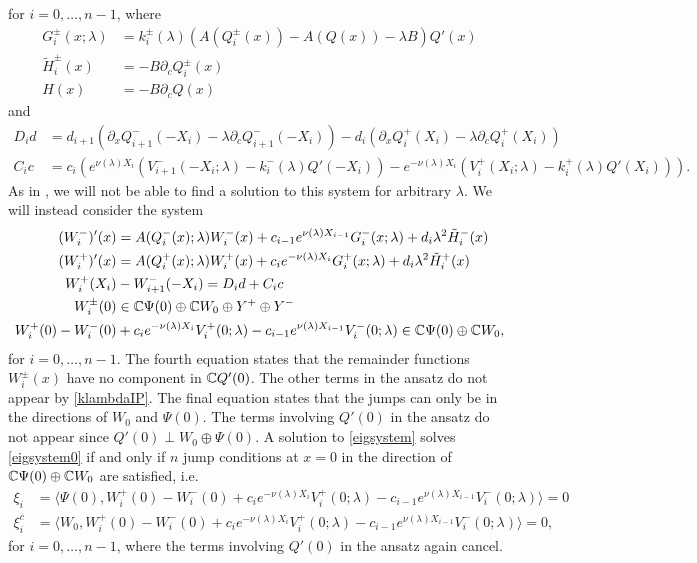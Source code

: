 \documentclass[12pt]{elsarticle}
\theoremstyle{plain}
\theoremstyle{definition}
\theoremstyle{remark}
\numberwithin{theorem}{section}
\numberwithin{equation}{section}
\begin{document}
for $i = 0, \dots, n-1$, where
\begin{equation}\label{defGH}
\begin{aligned}
G_i^\pm(x; \lambda) &= k_i^\pm(\lambda)\left( A(Q_i^\pm(x)) - A(Q(x)) - \lambda B \right) Q'(x) \\
\tilde{H}_i^\pm(x) &= -B \partial_c Q_i^\pm(x)\\
H(x) &= -B \partial_c Q(x)
\end{aligned}
\end{equation}
and
\begin{align}
D_i d &= d_{i+1}\left(\partial_x Q_{i+1}^-(-X_i) - \lambda \partial_c Q_{i+1}^-(-X_i)\right) - d_i \left( \partial_x Q_i^+(X_i) - \lambda \partial_c Q_i^+(X_i) \right) \label{defDid} \\
C_i c &= c_i \left( e^{\nu(\lambda) X_i} (V_{i+1}^-(-X_i; \lambda) - k_i^-(\lambda)Q'(-X_i)) - e^{-\nu(\lambda) X_i} (V_i^+(X_i; \lambda) - k_i^+(\lambda) Q'(X_i)) \right). \label{defCic}
\end{align}
As in \cite{Sandstede1998}, we will not be able to find a solution to this system for arbitrary $\lambda$. We will instead consider the system
\begin{equation}\label{eigsystem}
\begin{aligned}
(W_i^-)'(x) &= A(Q_i^-(x); \lambda) W_i^-(x) + c_{i-1} e^{\nu(\lambda)X_{i-1}}  G_i^-(x; \lambda) + d_i \lambda^2 \tilde{H}_i^-(x) \\
(W_i^+)'(x) &= A(Q_i^+(x); \lambda) W_i^+(x) + c_i e^{-\nu(\lambda)X_i}  G_i^+(x; \lambda) + d_i \lambda^2 \tilde{H}_i^+(x) \\
W_i^+(X_i) &- W_{i+1}^-(-X_i) = D_i d + C_i c \\
W_i^\pm(0) &\in \mathbb{C} \Psi(0) \oplus \mathbb{C} W_0 \oplus Y^+ \oplus Y^- \\
W_i^+(0) - W_i^-(0) &+ c_i e^{-\nu(\lambda)X_i}V_i^+(0; \lambda) - c_{i-1} e^{\nu(\lambda)X_{i-1}} V_i^-(0; \lambda) \in \mathbb{C} \Psi(0) \oplus \mathbb{C} W_0,
\end{aligned}
\end{equation}
for $i = 0, \dots, n-1$. The fourth equation states that the remainder functions $W_i^\pm(x)$ have no component in $\mathbb{C} Q'(0)$. The other terms in the ansatz do not appear by \cref{klambdaIP}. The final equation states that the jumps can only be in the directions of $W_0$ and $\Psi(0)$. The terms involving $Q'(0)$ in the ansatz do not appear since $Q'(0) \perp W_0\oplus\Psi(0)$. A solution to \cref{eigsystem} solves \cref{eigsystem0} if and only if $n$ jump conditions at $x = 0$ in the direction of $\mathbb{C} \Psi(0) \oplus \mathbb{C} W_0$ are satisfied, i.e.  
\begin{equation}\label{jumpxi1}
\begin{aligned}
\xi_i &= \langle \Psi(0), W_i^+(0) - W_i^-(0) + c_i e^{-\nu(\lambda)X_i}V_i^+(0; \lambda) - c_{i-1} e^{\nu(\lambda)X_{i-1}} V_i^-(0; \lambda) \rangle = 0  \\
\xi_i^c &= \langle W_0, W_i^+(0) - W_i^-(0) + c_i e^{-\nu(\lambda)X_i}V_i^+(0; \lambda) - c_{i-1} e^{\nu(\lambda)X_{i-1}} V_i^-(0; \lambda) \rangle = 0,
\end{aligned}
\end{equation}
for $i = 0, \dots, n-1$, where the terms involving $Q'(0)$ in the ansatz again cancel.
\end{document}
